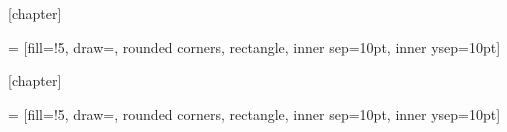 \newcommand{\prop}[2][]
{\stepcounter{propcounter}
	\setlength{\netlength}{\textwidth}
	\addtolength{\netlength}{-20pt}
	
	\medskip\noindent
	\begin{tikzpicture}
	\node[pboxstyle] (dbox)
	{\begin{minipage}{\netlength}
		\ifthenelse{\equal{#1}{\empty}}{\smallskip}{\medskip}
		#2
		\end{minipage}
	};
	\node at (dbox.north west) [xshift=2mm, anchor=west, fill=white, text=\propcolorborder, top color=white, bottom color=\propcolorfill!5, rounded corners]
	{\textbf{\large Propriété \arabic{propcounter}}
		\ifthenelse{\equal{#1}{\empty}}{}{{\large(#1)}}
	};
	\end{tikzpicture}
}


[chapter]

 = [fill=\exemplecolorfill!5,
draw=\exemplecolorborder,
rounded corners,
rectangle, inner sep=10pt, inner ysep=10pt]

\newcommand{\exemple}[2][]
{\stepcounter{exemplecounter}
	\setlength{\netlength}{\textwidth}
	\addtolength{\netlength}{-20pt}
	
	\medskip\noindent
	\begin{tikzpicture}
	\node[eboxstyle] (dbox)
	{\begin{minipage}{\netlength}
		\ifthenelse{\equal{#1}{\empty}}{\smallskip}{\medskip}
		#2
		\end{minipage}
	};
	\node at (dbox.north west) [xshift=2mm, anchor=west, fill=white, text=\exemplecolorborder, top color=white, bottom color=\exemplecolorfill!5, rounded corners]
	{\textbf{\large Exemple}
		\ifthenelse{\equal{#1}{\empty}}{}{{\large(#1)}}
	};
	\end{tikzpicture}
}

[chapter]

 = [fill=\activitycolorfill!5,
draw=\activitycolorborder,
rounded corners,
rectangle, inner sep=10pt, inner ysep=10pt]

\newcommand{\activite}[2][]
{\refstepcounter{activitycounter}
	\setlength{\netlength}{\textwidth}
	\addtolength{\netlength}{-20pt}
	
	\medskip\noindent
	\begin{tikzpicture}
	\node[aboxstyle] (dbox)
	{\begin{minipage}{\netlength}
		\ifthenelse{\equal{#1}{\empty}}{\smallskip}{\medskip}
		#2
		\end{minipage}
	};
	\node at (dbox.north west) [xshift=2mm, anchor=west, fill=white, text=\activitycolorborder, top color=white, bottom color=\activitycolorfill!5, rounded corners]
	{\textbf{\large Activité \arabic{activitycounter}}
		\ifthenelse{\equal{#1}{\empty}}{}{{\large(#1)}}
	};
	\end{tikzpicture}
}



